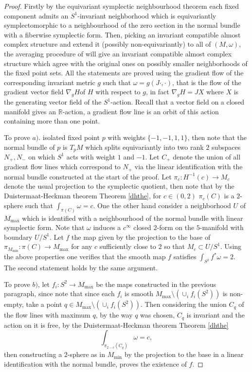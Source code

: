 \documentclass[12pt]{article}
\begin{document}
\begin{proof}
Firstly by the equivariant symplectic neighbourhood theorem  \cite[Theorem A.1]{Ka} each fixed component admits an $S^1$-invariant neighborhood which is equivariantly symplectomorphic to a neighbourhood of the zero section in the normal bundle with a fiberwise symplectic form. Then, picking an invariant compatible almost complex structure and extend it (possibly non-equivariantly) to all of $(M,\omega)$, the averaging procedure of \cite{MS} will give an invariant compatible almost complex structure which agree with the original ones on possibly smaller neighborhoods of the fixed point sets. All the statements are proved using the gradient flow of the corresponding invariant metric $g$ such that $\omega = g(J\cdot, \cdot)$, that is the flow of the gradient vector field $\nabla_g H$of $H$ with respect to $g$, in fact $\nabla_{g}H = JX$ where $X$ is the generating vector field of the $S^1$-action. Recall that a vector field on a closed manifold gives an $\mathbb{R}$-action, a gradient flow line is an orbit of this action containing more than one point. 

To prove $a).$ isolated fixed point $p$ with weights $\{-1,-1,1,1\}$, then note that the normal bundle of $p$ is $T_{p}M$ which splits equivariantly into two rank $2$ subspaces $N_{+},N_{-}$ on which $S^1$ acts with weight $1$ and $-1$. Let $C_+$ denote the union of all gradient flow lines which correspond to $N_{+}$ via the linear identification with the normal bundle constructed at the start of the proof. Let $\pi_c: H^{-1}(c) \rightarrow M_{c}$ denote the usual projection to the symplectic quotient, then note that by the Duistermaat-Heckman theorem Theorem \ref{dhthe}, for $c \in (0,2)$ $\pi_c(C)$ is a $2$-sphere such that $\int_{\pi(C)} \omega = c$.  One the other hand consider a neighborhood $U$ of $M_{\max}$ which is identified with a neighbourhood of the normal bundle with linear symplectic form. Note that $\omega$ induces a $c^\infty$ closed $2$-form on the $5$-manifold with boundary $U/S^1$. Let $f$ the map given by the projection to the base of $\pi_{M_{\min}} : \pi(C) \rightarrow M_{\max}$ for any $c$ sufficiently close to $2$ so that $M_{c} \subset U/S^1$. Using the above properties one verifies that the smooth map $f$ satisfies $\int_{S^2} f^{*}\omega = 2$. The second statement holds by the same argument.

To prove $b)$, let $f_i: S^2 \rightarrow M_{\max}$ be the maps constructed in the previous paragraph, since note that since each $f_i$ is smooth $M_{\max} \setminus (\cup_{i} f_i(S^2))$ is non-empty, take a point $q \in M_{\max} \setminus (\cup_{i} f_i(S^2))$. Then considering the union $C_q$ of the flow lines with maximum $q$, by the way $q$ was chosen,  $C_{q}$ is invariant and the action on it is free, by the Duistermaat-Heckman theorem 
Theorem \ref{dhthe} $$\int_{\pi_{2-c}(C_{q})} \omega = c,$$ then constructing a $2$-sphere as in $M_{\min}$ by the projection to the base in a linear identification with the normal bundle, proves the existence of $f$.


\end{proof}
\end{document}
